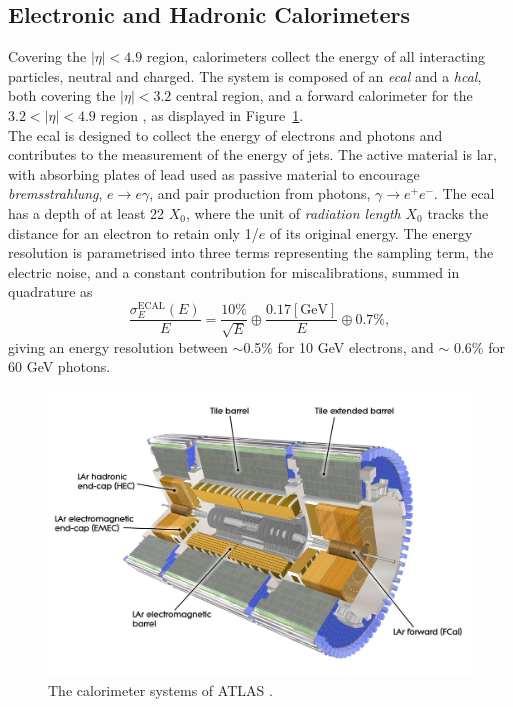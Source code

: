\subsection{Electronic and Hadronic Calorimeters}
Covering the $|\eta| < 4.9$ region, calorimeters collect the energy of all interacting particles, neutral and charged. The system is composed of an \textit{\gls{ecal}} and a \textit{\gls{hcal}}, both covering the $|\eta| < 3.2$ central region, and a forward calorimeter for the $3.2 < |\eta| < 4.9$ region \cite{TheATLASCollaboration_2008}, as displayed in Figure~\ref{fig-AtlasDecCalo}.\\

The \gls{ecal} is designed to collect the energy of electrons and photons and contributes to the measurement of the energy of jets. The active material is \gls{lar}, with absorbing plates of lead used as passive material to encourage \textit{bremsstrahlung}, $e \rightarrow e\gamma$, and pair production from photons, $\gamma \rightarrow e^+e^-$. The \gls{ecal} has a depth of at least 22 $X_0$, where the unit of \textit{radiation length} $X_0$ tracks the distance for an electron to retain only 1/$e$ of its original energy. The energy resolution is parametrised into three terms representing the sampling term, the electric noise, and a constant contribution for miscalibrations, summed in quadrature as \cite{Cavallari_2011}
\begin{equation}
  \frac{\sigma_E^{\text{ECAL}}(E)}{E} = \frac{10\%}{\sqrt{E}} \oplus \frac{0.17 [\text{GeV}]}{E} \oplus 0.7\%,
\end{equation}
giving an energy resolution between $\sim$0.5\% for 10 GeV electrons, and $\sim$ 0.6\% for 60 GeV photons.\\

\begin{figure}[!h]
  \centering
  \includegraphics[width=\textwidth]{Images/ATLAS/ATLASCalo.jpg}
  \caption{The calorimeter systems of ATLAS \cite{ATLASschematics}.}
  \label{fig-AtlasDecCalo}
\end{figure}

